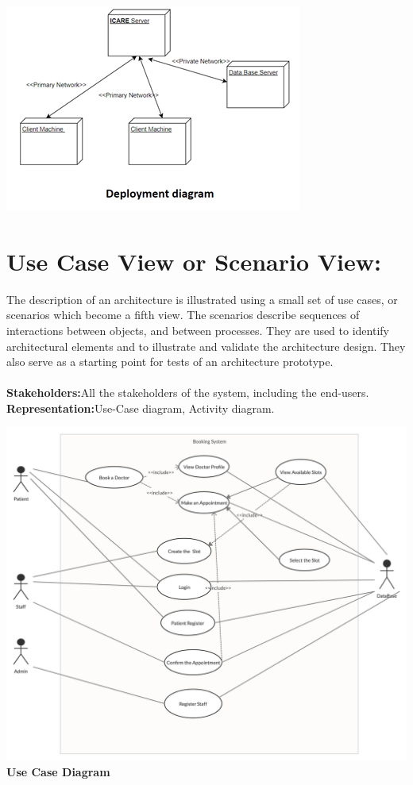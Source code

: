 \documentclass[a4paper,12pt]{report}
\begin{document}
\begin{center}
    \includegraphics{UML/deployment.png}
\end{center}

\section*{Use Case View or Scenario View:}
The description of an architecture is illustrated using a small set of use cases, or scenarios which become a fifth view. The scenarios describe sequences of interactions between objects, and between processes. They are used to identify architectural elements and to illustrate and validate the architecture design. They also serve as a starting point for tests of an architecture prototype.\\\\
\textbf{Stakeholders:}All the stakeholders of the system, including the end-users.\\
\textbf{Representation:}Use-Case diagram, Activity diagram.
    \begin{center}
        \includegraphics[scale=.15]{UML/UseCase.png}\\
        \textbf{Use Case Diagram}
    \end{center}
    
\end{document}
